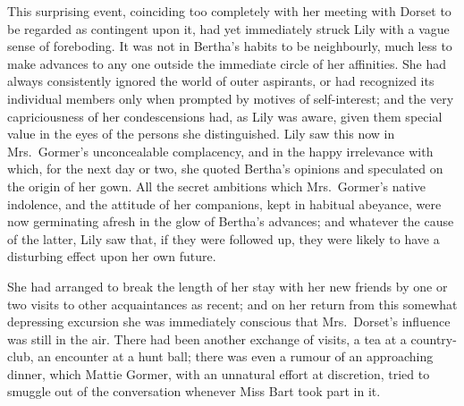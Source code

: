 \documentclass[12pt,a4paper]{book}
\begin{document}
This surprising event, coinciding too completely with her meeting
with Dorset to be regarded as contingent upon it, had yet
immediately struck Lily with a vague sense of foreboding. It was
not in Bertha's habits to be neighbourly, much less to make
advances to any one outside the immediate circle of her
affinities. She had always consistently ignored the world of
outer aspirants, or had recognized its individual members only
when prompted by motives of self-interest; and the very
capriciousness of her condescensions had, as Lily was aware,
given them special value in the eyes of the persons she
distinguished. Lily saw this now in Mrs.\ Gormer's unconcealable
complacency, and in the happy irrelevance with which, for the
next day or two, she quoted Bertha's opinions and
speculated on the origin of her gown. All the secret ambitions
which Mrs.\ Gormer's native indolence, and the attitude of her
companions, kept in habitual abeyance, were now germinating
afresh in the glow of Bertha's advances; and whatever the cause
of the latter, Lily saw that, if they were followed up, they were
likely to have a disturbing effect upon her own future.





She had arranged to break the length of her stay with her new
friends by one or two visits to other acquaintances as recent;
and on her return from this somewhat depressing excursion she was
immediately conscious that Mrs.\ Dorset's influence was still in
the air. There had been another exchange of visits, a tea at a
country-club, an encounter at a hunt ball; there was even a
rumour of an approaching dinner, which Mattie Gormer, with an
unnatural effort at discretion, tried to smuggle out of the
conversation whenever Miss Bart took part in it.
\end{document}
